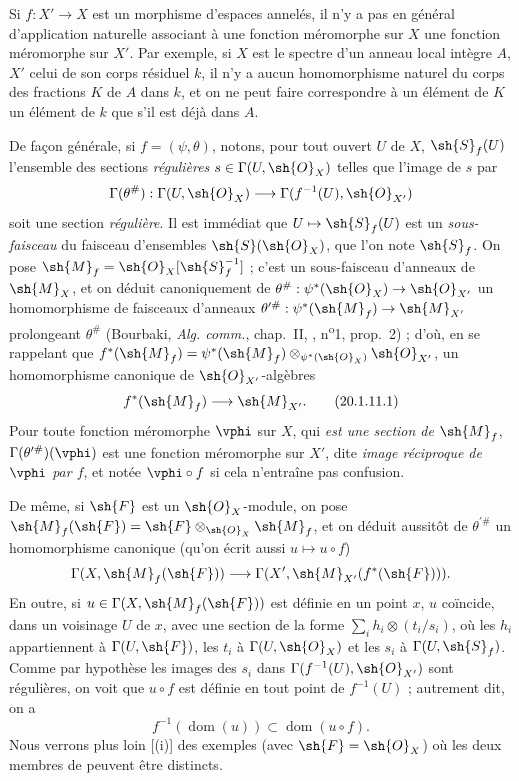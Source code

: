 \begin{env}[20.1.11]
\label{IV.20.1.11}
Si $f:X'\to X$ est un morphisme d'espaces annelés, il n'y a pas en général d'application naturelle associant à une fonction méromorphe sur $X$ une fonction méromorphe sur $X'$.
Par exemple, si $X$ est le spectre d'un anneau local intègre $A$, $X'$ celui de son corps résiduel $k$, il n'y a aucun homomorphisme naturel du corps des fractions $K$ de $A$ dans $k$, et on ne peut faire correspondre à un élément de $K$ un élément de $k$ que s'il est déjà dans $A$.

De façon générale, si $f=(\psi,\theta)$, notons, pour tout ouvert $U$ de $X$, $\sh{S}_f(U)$ l'ensemble des sections \emph{régulières} $s\in\Gamma(U,\sh{O}_X)$ telles que l'image de $s$ par
\[
  \Gamma(\theta^\#):\Gamma(U,\sh{O}_X)\to\Gamma(f^{-1}(U),\sh{O}_{X'})
\]
soit une section \emph{régulière}.
Il est immédiat que $U\mapsto\sh{S}_f(U)$ est un \emph{sous-faisceau} du faisceau d'ensembles $\sh{S}(\sh{O}_X)$, que l'on note $\sh{S}_f$.
On pose $\sh{M}_f=\sh{O}_X[\sh{S}_f^{-1}]$ ; c'est un sous-faisceau
d'anneaux de $\sh{M}_X$, et on déduit canoniquement de $\theta^\#:\psi^*(\sh{O}_X)\to\sh{O}_{X'}$ un homomorphisme de faisceaux d'anneaux $\theta^{\prime\#}:\psi^*(\sh{M}_f)\to\sh{M}_{X'}$ prolongeant $\theta^\#$ (Bourbaki, \emph{Alg. comm.}, chap.~II, , n\textsuperscript{o}1, prop.~2) ; d'où, en se rappelant que $f^*(\sh{M}_f)=\psi^*(\sh{M}_f)\otimes_{\psi^*(\sh{O}_X)}\sh{O}_{X'}$, un homomorphisme canonique de $\sh{O}_{X'}$-algèbres
\[
\label{IV.20.1.11.1}
  f^*(\sh{M}_f)\to\sh{M}_{X'}.
  \tag{20.1.11.1}
\]
Pour toute fonction méromorphe $\vphi$ sur $X$, qui \emph{est une section de $\sh{M}_f$}, $\Gamma(\theta^{\prime\#})(\vphi)$ est une fonction méromorphe sur $X'$, dite \emph{image réciproque de $\vphi$ par $f$}, et notée $\vphi\circ f$ si cela n'entraîne pas confusion.

De même, si $\sh{F}$ est un $\sh{O}_X$-module, on pose $\sh{M}_f(\sh{F})=\sh{F}\otimes_{\sh{O}_X}\sh{M}_f$, et on déduit aussitôt de $\theta^{\prime\#}$ un homomorphisme canonique (qu'on écrit aussi $u\mapsto u\circ f$)
\[
  \Gamma(X,\sh{M}_f(\sh{F}))\to\Gamma(X',\sh{M}_{X'}(f^*(\sh{F}))).
\]
En outre, si $u\in\Gamma(X,\sh{M}_f(\sh{F}))$ est définie  en un point $x$, $u$ coïncide, dans un voisinage $U$ de $x$, avec une section de la forme $\sum_i h_i\otimes(t_i/s_i)$, où les $h_i$ appartiennent à $\Gamma(U,\sh{F})$, les $t_i$ à $\Gamma(U,\sh{O}_X)$ et les $s_i$ à $\Gamma(U,\sh{S}_f)$.
Comme par hypothèse les images des $s_i$ dans $\Gamma(f^{-1}(U),\sh{O}_{X'})$ sont régulières, on voit que $u\circ f$ est définie en tout point de $f^{-1}(U)$ ; autrement dit, on a
\[
\label{IV.20.1.11.2}
  f^{-1}(\operatorname{dom}(u))\subset\operatorname{dom}(u\circ f).
  \tag{20.1.11.2}
\]
Nous verrons plus loin [(i)] des exemples (avec $\sh{F}=\sh{O}_X$) où les deux membres de  peuvent être distincts.


\end{env}
